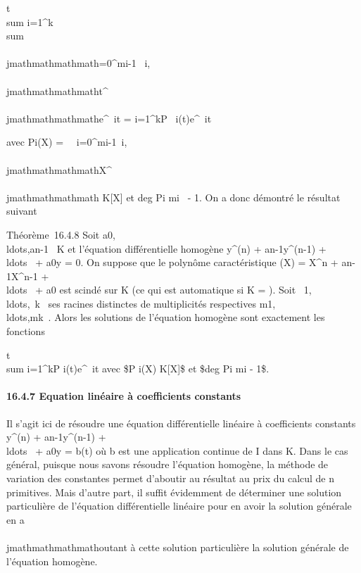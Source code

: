 t\mapsto~\\sum
i=1^k \\sum
\\\\jmathmathmathmath=0^mi-1\alpha~
i,\\\\jmathmathmathmatht^\\\\jmathmathmathmathe^\lambda~it =
\sum i=1^kP~
i(t)e^\lambda~it

avec Pi(X) =\
\sum ~
i=0^mi-1\alpha~i,\\\\jmathmathmathmathX^\\\\jmathmathmathmath \in K{[}X{]}
et deg Pi \leq mi~ - 1. On a
donc démontré le résultat suivant

Théorème~16.4.8 Soit
a0,\\ldots,an-1~
\in K et l'équation différentielle homogène y^(n) +
an-1y^(n-1) +
\\ldots~ +
a0y = 0. On suppose que le polynôme caractéristique \chi(X) =
X^n + an-1X^n-1 +
\\ldots~ +
a0 est scindé sur K (ce qui est automatique si K = ). Soit
\lambda~1,\\ldots,\lambda~k~
ses racines distinctes de multiplicités respectives
m1,\\ldots,mk~.
Alors les solutions de l'équation homogène sont exactement les fonctions

t\mapsto~\\sum
i=1^kP
i(t)e^\lambda~it\quad
\text avec \$P i(X) \in K{[}X{]}\$ et \$deg
Pi \leq mi - 1\$.

\paragraph{16.4.7 Equation linéaire à coefficients constants}

Il s'agit ici de résoudre une équation différentielle linéaire à
coefficients constants y^(n) +
an-1y^(n-1) +
\\ldots~ +
a0y = b(t) où b est une application continue de I dans K. Dans
le cas général, puisque nous savons résoudre l'équation homogène, la
méthode de variation des constantes permet d'aboutir au résultat au prix
du calcul de n primitives. Mais d'autre part, il suffit évidemment de
déterminer une solution particulière de l'équation différentielle
linéaire pour en avoir la solution générale en a\\\\jmathmathmathmathoutant à cette solution
particulière la solution générale de l'équation homogène.

